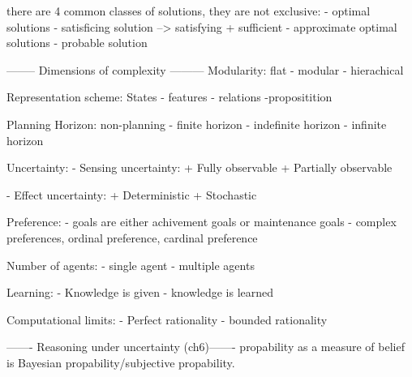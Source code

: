 there are 4 common classes of solutions, they are not exclusive:
- optimal solutions
- satisficing solution --> satisfying + sufficient
- approximate optimal solutions
- probable solution

 -------- Dimensions of complexity ---------
Modularity:
flat - modular - hierachical

Representation scheme:
States - features - relations -propositition

Planning Horizon:
non-planning - finite horizon - indefinite horizon - infinite horizon

Uncertainty:
- Sensing uncertainty:
+ Fully observable
+ Partially observable

- Effect uncertainty:
+ Deterministic
+ Stochastic

Preference:
- goals are either achivement goals or maintenance goals
- complex preferences, ordinal preference, cardinal preference

Number of agents:
- single agent
- multiple agents

Learning:
- Knowledge is given
- knowledge is learned

Computational limits:
- Perfect rationality
- bounded rationality

------- Reasoning under uncertainty (ch6)-------
propability as a measure of belief is Bayesian propability/subjective
propability.










